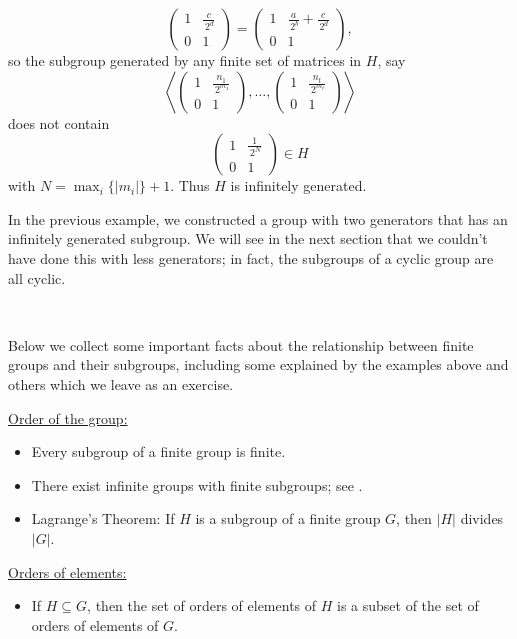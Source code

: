 \begin{example}
$$\begin{pmatrix} 1 & \frac{c}{\, 2^d} \\ 0 & 1 \end{pmatrix} = 
\begin{pmatrix} 1 & \frac{a}{\, 2^b} + \frac{c}{\, 2^d} \\ 0 & 1 \end{pmatrix},$$
so the subgroup generated by any finite set of matrices in $H$, say
$$\left\langle \begin{pmatrix} 1 & \frac{n_1}{\, 2^{m_1}} \\ 0 & 1 \end{pmatrix}, \ldots, \begin{pmatrix} 1 & \frac{n_t}{\, 2^{m_t}} \\ 0 & 1 \end{pmatrix} \right\rangle$$
does not contain
$$\begin{pmatrix} 1 & \frac{1}{\, 2^{N}} \\ 0 & 1 \end{pmatrix} \in H$$
with $N = \max_i \{|m_i| \} + 1$. Thus $H$ is infinitely generated.
\end{example}

In the previous example, we constructed a group with two generators that has an infinitely generated subgroup. We will see in the next section that we couldn't have done this with less generators; in fact, the subgroups of a cyclic group are all cyclic.


\


Below we collect some important facts about the relationship between finite groups and their subgroups, including some explained by the examples above and others which we leave as an exercise.


\vspace{0.5em}

\underline{Order of the group:}
\vspace{-0.3em}
\begin{itemize}[itemsep=-0.2em]
\item Every subgroup of a finite group is finite.
\item There exist infinite groups with finite subgroups; see .
\item Lagrange's Theorem: If $H$ is a subgroup of a finite group $G$, then $|H|$ divides $|G|$.
\end{itemize}

\underline{Orders of elements:}
\vspace{-0.3em}
\begin{itemize}
\item  If $H \subseteq G$, then the set of orders of elements of $H$ is a subset of the set of orders of elements of $G$.
\end{itemize}

